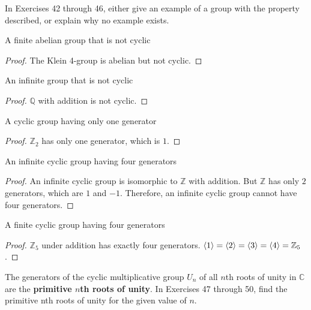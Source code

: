 In Exercises 42 through 46, either give an example of a group with the property described, or explain why no example exists.

\begin{exercise}
    A finite abelian group that is not cyclic
\end{exercise}

\begin{proof}
    The Klein 4-group is abelian but not cyclic.
\end{proof}

\begin{exercise}
    An infinite group that is not cyclic
\end{exercise}

\begin{proof}
    $\mathbb{Q}$ with addition is not cyclic.
\end{proof}

\begin{exercise}
    A cyclic group having only one generator
\end{exercise}

\begin{proof}
    $\mathbb{Z}_{2}$ has only one generator, which is $1$.
\end{proof}

\begin{exercise}
    An infinite cyclic group having four generators
\end{exercise}

\begin{proof}
    An infinite cyclic group is isomorphic to $\mathbb{Z}$ with addition. But $\mathbb{Z}$ has only $2$ generators, which are $1$ and $-1$. Therefore, an infinite cyclic group cannot have four generators.
\end{proof}

\begin{exercise}
    A finite cyclic group having four generators
\end{exercise}

\begin{proof}
    $\mathbb{Z}_{5}$ under addition has exactly four generators. $\left\langle{1}\right\rangle = \left\langle{2}\right\rangle = \left\langle{3}\right\rangle = \left\langle{4}\right\rangle = \mathbb{Z}_{5}$.
\end{proof}

The generators of the cyclic multiplicative group $U_{n}$ of all $n$th roots of unity in $\mathbb{C}$ are the \textbf{primitive $n$th roots of unity}. In Exercises 47 through 50, find the primitive nth roots of unity for the given value of $n$.

